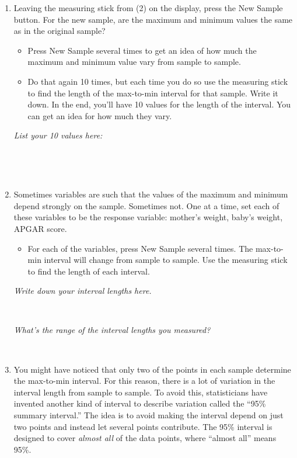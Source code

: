 \documentclass[nofonts,]{tufte-handout}
\providecommand{\tightlist}{%
  \setlength{\itemsep}{0pt}\setlength{\parskip}{0pt}}
\begin{document}
\begin{enumerate}
\def\labelenumi{\arabic{enumi}.}
\setcounter{enumi}{2}
\item
  Leaving the measuring stick from (2) on the display, press the New
  Sample button. For the new sample, are the maximum and minimum values
  the same as in the original sample?

  \begin{itemize}
  \tightlist
  \item
    Press New Sample several times to get an idea of how much the
    maximum and minimum value vary from sample to sample.
  \item
    Do that again 10 times, but each time you do so use the measuring
    stick to find the length of the max-to-min interval for that sample.
    Write it down. In the end, you'll have 10 values for the length of
    the interval. You can get an idea for how much they vary.
  \end{itemize}

  \emph{List your 10 values here:} ~

  ~

  ~
\item
  Sometimes variables are such that the values of the maximum and
  minimum depend strongly on the sample. Sometimes not. One at a time,
  set each of these variables to be the response variable: mother's
  weight, baby's weight, APGAR score.

  \begin{itemize}
  \tightlist
  \item
    For each of the variables, press New Sample several times. The
    max-to-min interval will change from sample to sample. Use the
    measuring stick to find the length of each interval.
  \end{itemize}

  \emph{Write down your interval lengths here.} ~

  ~

  \emph{What's the range of the interval lengths you measured?} ~

  ~
\item
  You might have noticed that only two of the points in each sample
  determine the max-to-min interval. For this reason, there is a lot of
  variation in the interval length from sample to sample. To avoid this,
  statisticians have invented another kind of interval to describe
  variation called the ``95\% summary interval.'' The idea is to avoid
  making the interval depend on just two points and instead let several
  points contribute. The 95\% interval is designed to cover \emph{almost
  all} of the data points, where ``almost all'' means 95\%.


\end{enumerate}
\end{document}
